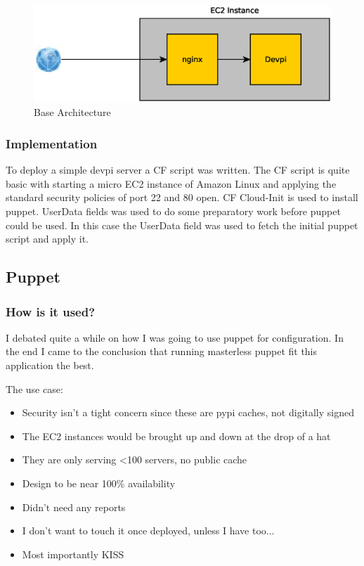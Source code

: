 \documentclass[12pt, letterpaper]{article}
\begin{document}
\begin{figure}[H]
    \caption{Base Architecture}
    \centering
    \includegraphics[width=\textwidth]{figures/base_arch.eps}
\end{figure}


\subsubsection{Implementation}
To deploy a simple devpi server a CF script was written. The CF script
is quite basic with starting a micro EC2 instance of Amazon Linux and applying the standard security policies of
port 22 and 80 open. CF Cloud-Init is used to install puppet. UserData fields was used to do some preparatory work before
puppet could be used. In this case the UserData field was used to fetch the initial puppet script and apply it.

\subsection{Puppet}
\subsubsection{How is it used?}
I debated quite a while on how I was going to use puppet for configuration. In the end I came to the conclusion that
running masterless puppet fit this application the best.  

The use case:
\begin{itemize}
    \item Security isn't a tight concern since these are pypi caches, not digitally signed
    \item The EC2 instances would be brought up and down at the drop of a hat
    \item They are only serving \textless 100 servers, no public cache
    \item Design to be near 100\% availability 
    \item Didn't need any reports
    \item I don't want to touch it once deployed, unless I have too... 
    \item Most importantly KISS
\end{itemize}
\end{document}
